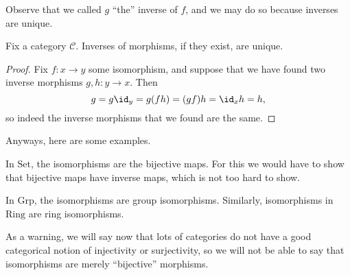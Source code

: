 Observe that we called $g$ ``the'' inverse of $f$, and we may do so because inverses are unique.
\begin{proposition}
	Fix a category $\mathcal C$. Inverses of morphisms, if they exist, are unique.
\end{proposition}
\begin{proof}
	Fix $f:x\to y$ some isomorphism, and suppose that we have found two inverse morphisms $g,h:y\to x$. Then
	\[g=g\id_y=g(fh)=(gf)h=\id_xh=h,\]
	so indeed the inverse morphisms that we found are the same.
\end{proof}
Anyways, here are some examples.
\begin{example}
	In $\mathrm{Set}$, the isomorphisms are the bijective maps. For this we would have to show that bijective maps have inverse maps, which is not too hard to show.
\end{example}
\begin{example}
	In $\mathrm{Grp}$, the isomorphisms are group isomorphisms. Similarly, isomorphisms in $\mathrm{Ring}$ are ring isomorphisms.
\end{example}
As a warning, we will say now that lots of categories do not have a good categorical notion of injectivity or surjectivity, so we will not be able to say that isomorphisms are merely ``bijective'' morphisms.